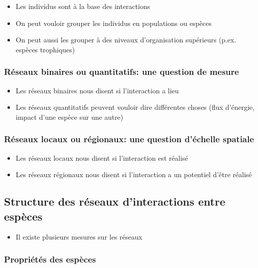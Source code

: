 \begin{itemize}
    \item Les individus sont à la base des interactions
    \item On peut vouloir grouper les individus en populations ou espèces
    \item On peut aussi les grouper à des niveaux d'organisation supérieurs (p.ex. espèces trophiques)
\end{itemize}

\subsubsection{Réseaux binaires ou quantitatifs: une question de mesure} 

\begin{itemize}
    \item Les réseaux binaires nous disent si l'interaction a lieu
    \item Les réseaux quantitatifs peuvent vouloir dire différentes choses (flux d'énergie, impact d'une espèce sur une autre)
\end{itemize}

\subsubsection{Réseaux locaux ou régionaux: une question d'échelle spatiale} 

\begin{itemize}
    \item Les réseaux locaux nous disent si l'interaction est réalisé 
    \item Les réseaux régionaux nous disent si l'interaction a un potentiel d'être réalisé
\end{itemize}

\subsection{Structure des réseaux d'interactions entre espèces} 

\begin{itemize}
    \item Il existe plusieurs mesures sur les réseaux 
\end{itemize}

\subsubsection{Propriétés des espèces} 

